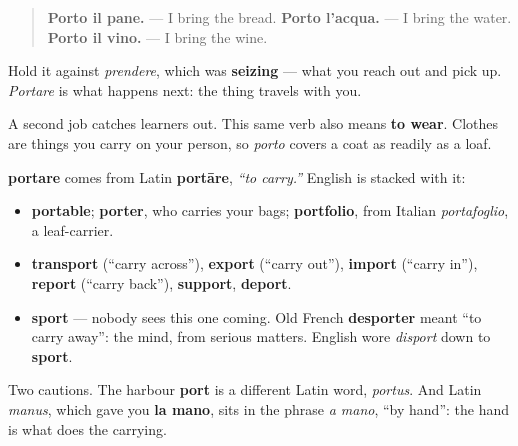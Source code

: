 \begin{quote}
\textbf{Porto il pane.} — I bring the bread. \textbf{Porto l'acqua.} — I bring the water. \textbf{Porto il vino.} — I bring the wine.
\end{quote}

Hold it against \emph{prendere}, which was \textbf{seizing} — what you reach out and pick up. \emph{Portare} is what happens next: the thing travels with you.

A second job catches learners out. This same verb also means \textbf{to wear}. Clothes are things you carry on your person, so \emph{porto} covers a coat as readily as a loaf.

\begin{cousinweb}
\textbf{portare} comes from Latin \textbf{portāre}, \emph{\textquotedblleft{}to carry.\textquotedblright{}} English is stacked with it:

\begin{itemize}
\raggedright
  \item \textbf{portable}; \textbf{porter}, who carries your bags; \textbf{portfolio}, from Italian \emph{portafoglio}, a leaf-carrier.
  \item \textbf{transport} (\textquotedblleft{}carry across\textquotedblright{}), \textbf{export} (\textquotedblleft{}carry out\textquotedblright{}), \textbf{import} (\textquotedblleft{}carry in\textquotedblright{}), \textbf{report} (\textquotedblleft{}carry back\textquotedblright{}), \textbf{support}, \textbf{deport}.
  \item \textbf{sport} — nobody sees this one coming. Old French \textbf{desporter} meant \textquotedblleft{}to carry away\textquotedblright{}: the mind, from serious matters. English wore \emph{disport} down to \textbf{sport}.
\end{itemize}

Two cautions. The harbour \textbf{port} is a different Latin word, \emph{portus}. And Latin \emph{manus}, which gave you \textbf{la mano}, sits in the phrase \emph{a mano}, \textquotedblleft{}by hand\textquotedblright{}: the hand is what does the carrying.
\end{cousinweb}


